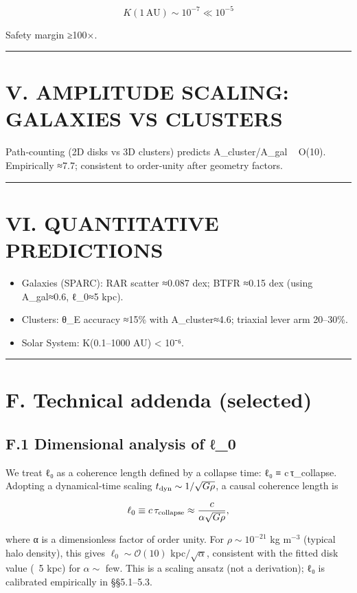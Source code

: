 \documentclass[11pt,a4paper]{article}
\begin{document}
\begin{equation}
K(1\,\mathrm{AU}) \sim 10^{-7} \ll 10^{-5}
\end{equation}

Safety margin ≥100×.


\medskip\hrule\medskip


\section{V. AMPLITUDE SCALING: GALAXIES VS CLUSTERS}


Path‑counting (2D disks vs 3D clusters) predicts A\_cluster/A\_gal ~ O(10). Empirically ≈7.7; consistent to order‑unity after geometry factors.


\medskip\hrule\medskip


\section{VI. QUANTITATIVE PREDICTIONS}


\begin{itemize}
\item Galaxies (SPARC): RAR scatter ≈0.087 dex; BTFR ≈0.15 dex (using A\_gal≈0.6, ℓ\_0≈5 kpc).
\item Clusters: θ\_E accuracy ≈15\% with A\_cluster≈4.6; triaxial lever arm 20–30\%.
\item Solar System: K(0.1–1000 AU) < 10⁻⁶.
\end{itemize}


\medskip\hrule\medskip


\section{F. Technical addenda (selected)}


\subsection{F.1 Dimensional analysis of ℓ\_0}


We treat ℓ₀ as a coherence length defined by a collapse time: ℓ₀ ≡ c\,τ\_{\rm collapse}. Adopting a dynamical‑time scaling $t_{\rm dyn}\sim 1/\sqrt{G\rho}$, a causal coherence length is

\begin{equation}
\ell_0 \equiv c\,\tau_{\rm collapse} \approx \frac{c}{\alpha\sqrt{G\rho}},
\end{equation}

where α is a dimensionless factor of order unity. For $\rho\sim 10^{-21}$ kg m$^{-3}$ (typical halo density), this gives $\ell_0\sim \mathcal{O}(10)$ kpc$/\sqrt{\alpha}$, consistent with the fitted disk value (~5 kpc) for $\alpha\sim$ few. This is a scaling ansatz (not a derivation); ℓ₀ is calibrated empirically in §§5.1–5.3.
\end{document}
